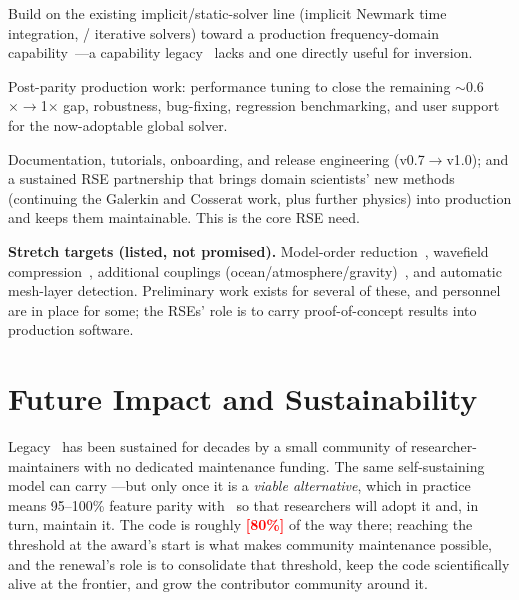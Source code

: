 \documentclass[11pt,letter]{article}
\newcommand{\note}[1]{\textbf{\textcolor{Red}{[#1]}}}
\begin{document}
\vspace{-0.4em}
\begin{description}[leftmargin=1.3em, itemsep=1pt, topsep=1pt]
\item[\textnormal{\textbf{D1 --- Frequency-domain solver (primary).}}] Build on the existing implicit/static-solver line (implicit Newmark time integration, / iterative solvers) toward a production frequency-domain capability~\citep{Gharti2023}---a capability legacy \SF\ lacks and one directly useful for inversion.
\item[\textnormal{\textbf{D2 --- Maintain and harden the 3D/global solver (primary).}}] Post-parity production work: performance tuning to close the remaining $\sim$0.6$\times\rightarrow$1$\times$ gap, robustness, bug-fixing, regression benchmarking, and user support for the now-adoptable global solver.
\item[\textnormal{\textbf{D3 --- Grow adoption and enable new physics with scientists (shared, primary).}}] Documentation, tutorials, onboarding, and release engineering (v0.7$\rightarrow$v1.0); and a sustained RSE partnership that brings domain scientists' new methods (continuing the Galerkin and Cosserat work, plus further physics) into production and keeps them maintainable. This is the core RSE need.
\end{description}

\noindent\textbf{Stretch targets (listed, not promised).} Model-order reduction~\citep{Hawkins2023}, wavefield compression~\citep{Boehm2016}, additional couplings (ocean/atmosphere/gravity)~\citep{Gharti2023}, and automatic mesh-layer detection. Preliminary work exists for several of these, and personnel are in place for some; the RSEs' role is to carry proof-of-concept results into production software.

\section{Future Impact and Sustainability}
Legacy \SF\ has been sustained for decades by a small community of researcher-maintainers with no dedicated maintenance funding. The same self-sustaining model can carry \SFPP---but only once it is a \emph{viable alternative}, which in practice means 95--100\% feature parity with \SFG\ so that researchers will adopt it and, in turn, maintain it. The code is roughly \note{80\%} of the way there; reaching the threshold at the award's start is what makes community maintenance possible, and the renewal's role is to consolidate that threshold, keep the code scientifically alive at the frontier, and grow the contributor community around it.
\end{document}
